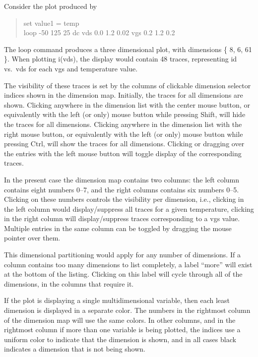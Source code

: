 Consider the plot produced by

\begin{quote}
{\vt set value1 = temp}\\
{\vt loop -50 125 25 dc vds 0.0 1.2 0.02 vgs 0.2 1.2 0.2}
\end{quote}

The {\cb loop} command produces a three dimensional plot, with
dimensions \{ 8, 6, 61 \}.  When plotting {\vt i(vds)}, the display
would contain 48 traces, representing {\vt id} vs.\ {\vt vds} for each
{\vt vgs} and temperature value.

The visibility of these traces is set by the columns of clickable
dimension selector indices shown in the dimension map.  Initially, the
traces for all dimensions are shown.  Clicking anywhere in the
dimension list with the center mouse button, or equivalently with the
left (or only) mouse button while pressing {\kb Shift}, will hide the
traces for all dimensions.  Clicking anywhere in the dimension list
with the right mouse button, or equivalently with the left (or only)
mouse button while pressing {\kb Ctrl}, will show the traces for all
dimensions.  Clicking or dragging over the entries with the left mouse
button will toggle display of the corresponding traces.

In the present case the dimension map contains two columns:  the left
column contains eight numbers 0--7, and the right columns contains six
numbers 0--5.  Clicking on these numbers controls the visibility per
dimension, i.e., clicking in the left column would display/suppress
all traces for a given temperature, clicking in the right column will
display/suppress traces corresponding to a {\vt vgs} value.  Multiple
entries in the same column can be toggled by dragging the mouse
pointer over them.

This dimensional partitioning would apply for any number of
dimensions.  If a column contains too many dimensions to list
completely, a label ``more'' will exist at the bottom of the listing. 
Clicking on this label will cycle through all of the dimensions, in
the columns that require it.

If the plot is displaying a single multidimensional variable, then
each least dimension is displayed in a separate color.  The numbers in
the rightmost column of the dimension map will use the same colors. 
In other columns, and in the rightmost column if more than one
variable is being plotted, the indices use a uniform color to indicate
that the dimension is shown, and in all cases black indicates a
dimension that is not being shown.

